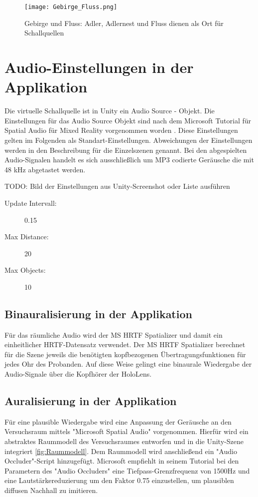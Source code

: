  \begin{figure}[H]
\centering
\texttt{[image: Gebirge\_Fluss.png]}
\caption{Gebirge und Fluss: Adler, Adlernest und Fluss dienen als  Ort für Schallquellen}
\label{fig:GebirgeFluss}
\end{figure}
   
  
   
    \section{Audio-Einstellungen in der Applikation}
    Die virtuelle Schallquelle ist in Unity ein Audio Source - Objekt. Die Einstellungen für das Audio Source Objekt sind nach dem Microsoft Tutorial für Spatial Audio für Mixed Reality vorgenommen worden \cite{MSSpatialAudio}. Diese Einstellungen gelten im Folgenden als Standart-Einstellungen. Abweichungen der Einstellungen werden in den Beschreibung für die Einzelszenen genannt.  Bei den abgespielten Audio-Signalen handelt es sich ausschließlich um MP3 codierte Geräusche die mit 48 kHz abgetastet werden. 
 
   TODO: Bild der Einstellungen aus Unity-Screenshot oder Liste ausführen 
   \begin{description}
\item[Update Intervall:] 0.15 
\item[Max Distance:] 20
\item[Max Objects:] 10
\end{description}


   \subsection{Binauralisierung in der Applikation}
   
Für das räumliche Audio wird der MS HRTF Spatializer und damit ein einheitlicher HRTF-Datensatz verwendet. Der MS HRTF Spatializer berechnet für die Szene jeweils die benötigten kopfbezogenen Übertragungsfunktionen für jedes Ohr des Probanden. Auf diese Weise gelingt eine binaurale Wiedergabe der Audio-Signale über die Kopfhörer der HoloLens. 

\subsection{Auralisierung in der Applikation}

Für eine plausible Wiedergabe wird eine Anpassung der Geräusche an den Versuchsraum mittels "Microsoft Spatial Audio" vorgenommen. Hierfür wird ein abstraktes Raummodell des Versuchsraumes entworfen und in die Unity-Szene integriert \ref{fig:Raummodell}. Dem Raummodell wird anschließend ein "Audio Occluder"-Script hinzugefügt. Microsoft empfiehlt in seinem Tutorial bei den Parametern des "Audio Occluders" eine Tiefpass-Grenzfrequenz von 1500Hz und eine Lautstärkereduzierung um den Faktor 0.75 einzustellen, um plausiblen diffusen Nachhall zu imitieren\cite{MSSpatialAudio}.
 
